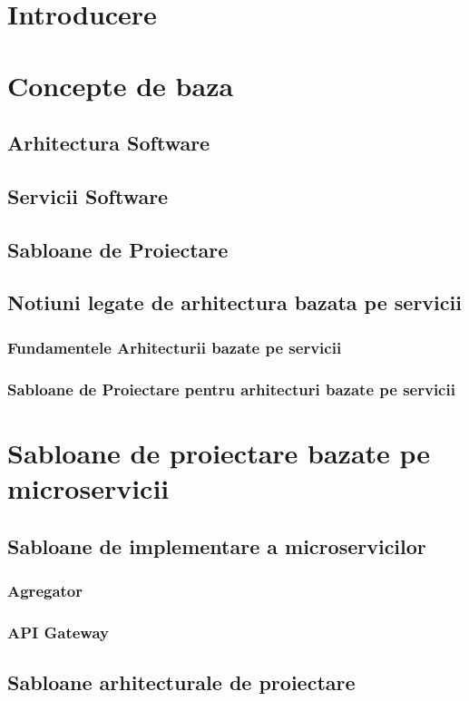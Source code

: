 \documentclass[12pt]{report}
\begin{document}
\tableofcontents
\cleardoublepage

\chapter{Introducere} 
  
\chapter{Concepte de baza} 
  \section{Arhitectura Software}
  \section{Servicii Software}
  \section{Sabloane de Proiectare}
  \section{Notiuni legate de arhitectura bazata pe servicii}
  	\subsection{Fundamentele Arhitecturii bazate pe servicii}
  	\subsection{Sabloane de Proiectare pentru arhitecturi bazate pe servicii}
  
\chapter{Sabloane de proiectare bazate pe microservicii}
	\section{Sabloane de implementare a microservicilor}
		\subsection{Agregator}
		\subsection{API Gateway}
	\section{Sabloane arhitecturale de proiectare}
\end{document}
